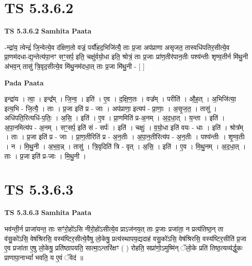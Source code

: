\documentclass[17pt]{extarticle}
\begin{document}
\section*{ TS 5.3.6.2 }

\textbf{TS 5.3.6.2 } \newline
\textbf{Samhita Paata} \newline

-न्द्रा॑य॒ त्वेन्द्रं॑ जि॒न्वेत्ये॒व द॑क्षिण॒तो वज्रं॒ पर्यौ॑हद॒भिजि॑त्यै॒ ताः प्र॒जा अप॑प्राणा असृजत॒ तास्वधि॑पतिर॒सीत्ये॒व प्रा॒णम॑दधा-द्य॒न्तेत्य॑पा॒नꣳ सꣳ॒॒सर्प॒ इति॒ चक्षु॑र्वयो॒धा इति॒ श्रोत्रं॒ ताः प्र॒जाः प्रा॑ण॒तीर॑पान॒तीः पश्य॑न्तीः शृण्व॒तीर्न मि॑थु॒नी अ॑भव॒न् तासु॑ त्रि॒वृद॒सीत्ये॒व मि॑थु॒नम॑दधा॒त् ताः प्र॒जा मि॑थु॒नी - [  ] \newline

\textbf{Pada Paata} \newline

इन्द्रा॑य । त्वा॒ । इन्द्र᳚म् । जि॒न्व॒ । इति॑ । ए॒व । द॒क्षि॒ण॒तः । वज्र᳚म् । परीति॑ । औ॒ह॒त् । अ॒भिजि॑त्या॒ इत्य॒भि - जि॒त्यै॒ । ताः । प्र॒जा इति॑ प्र - जाः । अप॑प्राणा॒ इत्यप॑ - प्रा॒णाः॒ । अ॒सृ॒ज॒त॒ । तासु॑ । अधि॑पति॒रित्यधि॑-प॒तिः॒ । अ॒सि॒ । इति॑ । ए॒व । प्रा॒णमिति॑ प्र-अ॒नम् । अ॒द॒धा॒त् । य॒न्ता । इति॑ । अ॒पा॒नमित्य॑प - अ॒नम् । सꣳ॒॒सर्प॒ इति॑ सं - सर्पः॑ । इति॑ । चक्षुः॑ । व॒यो॒धा इति॑ वयः - धाः । इति॑ । श्रोत्र᳚म् । ताः । प्र॒जा इति॑ प्र - जाः । प्रा॒ण॒तीरिति॑ प्र - अ॒न॒तीः । अ॒पा॒न॒तीरित्य॑प - अ॒न॒तीः । पश्य॑न्तीः । शृ॒ण्व॒तीः । न । मि॒थु॒नी । अ॒भ॒व॒न्न् । तासु॑ । त्रि॒वृदिति॑ त्रि - वृत् । अ॒सि॒ । इति॑ । ए॒व । मि॒थु॒नम् । अ॒द॒धा॒त् । ताः । प्र॒जा इति॑ प्र-जाः । मि॒थु॒नी ।  \newline




\section*{ TS 5.3.6.3 }

\textbf{TS 5.3.6.3 } \newline
\textbf{Samhita Paata} \newline

भव॑न्ती॒र्न प्राजा॑यन्त॒ ताः सꣳ॑रो॒हो॑ऽसि नीरो॒हो॑ऽसीत्ये॒व प्राऽज॑नय॒त् ताः प्र॒जाः प्रजा॑ता॒ न प्रत्य॑तिष्ठ॒न् ता व॑सु॒को॑ऽसि॒ वेष॑श्रिरसि॒ वस्य॑ष्टिर॒सीत्ये॒वैषु लो॒केषु॒ प्रत्य॑स्थापय॒द्यदाह॑ वसु॒को॑ऽसि॒ वेष॑श्रिरसि॒ वस्य॑ष्टिर॒सीति॑ प्र॒जा ए॒व प्रजा॑ता ए॒षु लो॒केषु॒ प्रति॑ष्ठापयति॒ सात्मा॒ऽन्तरि॑क्षꣳ ( ) रोहति॒ सप्रा॑णो॒ऽमुष्मि॑न् ॅलो॒के प्रति॑ तिष्ठ॒त्यव्य॑र्द्धुकः प्राणापा॒नाभ्यां᳚ भवति॒ य ए॒वं ॅवेद॑ ॥ \newline
\end{document}
